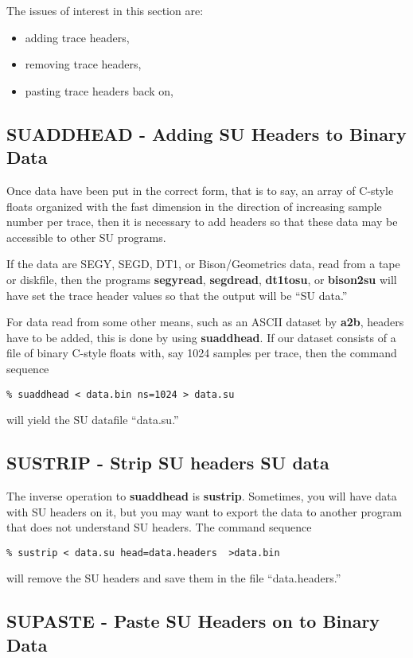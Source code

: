 {{{The issues of interest in this section are:
\begin{itemize}
\item adding trace headers,
\item removing trace headers,
\item pasting trace headers back on,
\end{itemize}

\subsection{SUADDHEAD - Adding SU Headers to Binary Data}
Once data have been put in the correct form, that is to say, 
an array of C-style floats organized with the fast dimension in
the direction of increasing sample number per trace, then
it is necessary to add headers so that these data may be accessible
to other SU programs.

If the data are SEGY, SEGD, DT1, or Bison/Geometrics data, 
read from a tape or diskfile, then the programs {\bf segyread},
{\bf segdread}, {\bf dt1tosu}, or {\bf bison2su} will have set
the trace header values so that the output will be ``SU data.''

For data read from some other means, such as an ASCII dataset
by {\bf a2b}, 
headers have to be added, this is done by using {\bf suaddhead}.
If our dataset consists of a file of binary C-style floats with,
say 1024 samples per trace, then the command sequence

{\small\begin{verbatim}
% suaddhead < data.bin ns=1024 > data.su
\end{verbatim} } \noindent
will yield the SU datafile ``data.su.''

\subsection{SUSTRIP - Strip SU headers SU data}
The inverse operation to {\bf suaddhead} is {\bf sustrip}.
Sometimes, you will have data with SU headers on it, but you may
want to export the data to another program that does not understand
SU headers. The command sequence
{\small\begin{verbatim}
% sustrip < data.su head=data.headers  >data.bin
\end{verbatim}}\noindent
will remove the SU headers and save them in the file ``data.headers.''

\subsection{SUPASTE - Paste SU Headers on to Binary Data}

}}}
